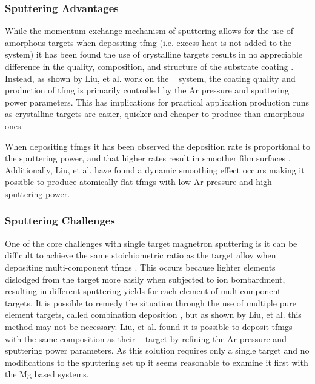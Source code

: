 \documentclass[a4paper,12pt,oneside]{report}%
\begin{document}
\subsubsection{Sputtering Advantages}
While the momentum exchange mechanism of sputtering allows for the use of amorphous targets when depositing \gls{tfmg} (i.e. excess heat is not added to the system) it has been found the use of crystalline targets results in no appreciable difference in the quality, composition, and structure of the substrate coating  \cite{Liu2012}. Instead, as shown by Liu, et al. \cite{Liu2012} work on the \ZrCuNiAl~ system, the coating quality and production of \gls{tfmg} is primarily controlled by the Ar pressure and sputtering power parameters. This has implications for practical application production runs as crystalline targets are easier, quicker and cheaper to produce than amorphous ones. 

When depositing \glspl{tfmg} it has been observed the deposition rate is proportional to the sputtering power, and that higher rates result in smoother film surfaces \cite{Cao2013, Liu2012}. Additionally, Liu, et al. \cite{Liu2012} have found a dynamic smoothing effect occurs making it possible to produce atomically flat \glspl{tfmg} with low Ar pressure and high sputtering power. 

\subsubsection{Sputtering Challenges}
One of the core challenges with single target magnetron sputtering is it can be difficult to achieve the same stoichiometric ratio as the target alloy when depositing multi-component \glspl{tfmg} \cite{Cao2013, Liu2012, Kondoh2008}. This occurs because lighter elements dislodged from the target more easily when subjected to ion bombardment, resulting in different sputtering yields for each element of multicomponent targets. It is possible to remedy the situation through the use of multiple pure element targets, called combination deposition \cite{Deng2007, Qin2009, Apreutesei2014}, but as shown by Liu, et al. \cite{Liu2012} this method may not be necessary. Liu, et al. \cite{Liu2012} found it is possible to deposit \glspl{tfmg} with the same composition as their \ZrCuNiAl~ target by refining the Ar pressure and sputtering power parameters. As this solution requires only a single target and no modifications to the sputtering set up it seems reasonable to examine it first with the Mg based systems. 
\end{document}
